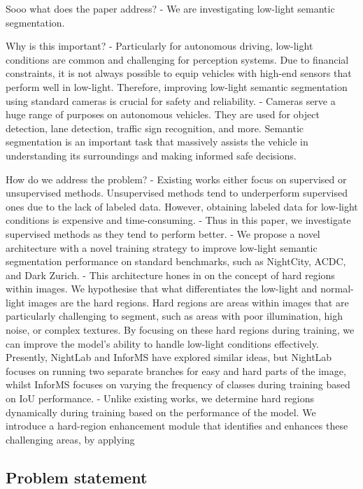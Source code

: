 \documentclass[journal]{IEEEtran}
\begin{document}
Sooo what does the paper address?
- We are investigating low-light semantic segmentation.

Why is this important?
- Particularly for autonomous driving, low-light conditions are common and challenging for perception systems. Due to financial constraints, it is not always possible to equip vehicles with high-end sensors that perform well in low-light. Therefore, improving low-light semantic segmentation using standard cameras is crucial for safety and reliability.
- Cameras serve a huge range of purposes on autonomous vehicles. They are used for object detection, lane detection, traffic sign recognition, and more. Semantic segmentation is an important task that massively assists the vehicle in understanding its surroundings and making informed safe decisions.

How do we address the problem?
- Existing works either focus on supervised or unsupervised methods. Unsupervised methods tend to underperform supervised ones due to the lack of labeled data. However, obtaining labeled data for low-light conditions is expensive and time-consuming.
- Thus in this paper, we investigate supervised methods as they tend to perform better.
- We propose a novel architecture with a novel training strategy to improve low-light semantic segmentation performance on standard benchmarks, such as NightCity, ACDC, and Dark Zurich.
- This architecture hones in on the concept of hard regions within images. We hypothesise that what differentiates the low-light and normal-light images are the hard regions. Hard regions are areas within images that are particularly challenging to segment, such as areas with poor illumination, high noise, or complex textures. By focusing on these hard regions during training, we can improve the model's ability to handle low-light conditions effectively. Presently, NightLab \cite{dengNightLabDualLevelArchitecture2022} and InforMS \cite{wangInformativeClassesMatter2023} have explored similar ideas, but NightLab focuses on running two separate branches for easy and hard parts of the image, whilst InforMS focuses on varying the frequency of classes during training based on IoU performance.
- Unlike existing works, we determine hard regions dynamically during training based on the performance of the model. We introduce a hard-region enhancement module that identifies and enhances these challenging areas, by applying




\subsection{Problem statement}
\end{document}
